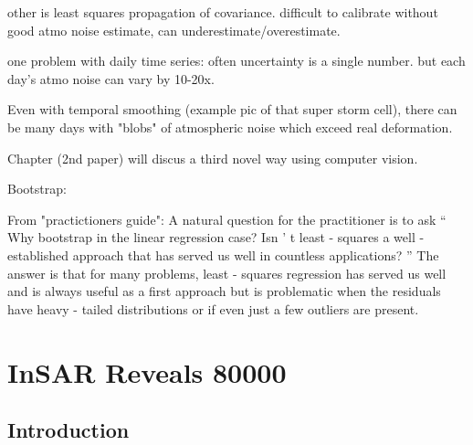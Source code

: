 \documentclass{utexasthesis}
\begin{document}
other is least squares propagation of covariance. difficult to calibrate without good atmo noise estimate, can underestimate/overestimate.

one problem with daily time series: often uncertainty is a single number. but each day's atmo noise can vary by 10-20x.

Even with temporal smoothing (example pic of that super storm cell), there can be many days with "blobs" of atmospheric noise which exceed real deformation.

Chapter (2nd paper) will discus a third novel way using computer vision.


Bootstrap:

From "practictioners guide":
A natural question for the practitioner is to ask  “ Why bootstrap in the linear regression case? Isn ’ t least - squares a well - established approach that  has  served  us  well  in  countless  applications? ”   The  answer  is  that  for  many  problems, least - squares regression has served us well and is always useful as  a first approach but is problematic when the residuals have heavy - tailed distributions or if even just a few outliers are present.



\chapter{InSAR Reveals 80000}
\label{chap-4-GRL}

\section{Introduction}
\end{document}
